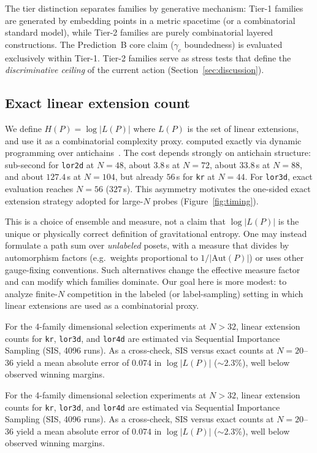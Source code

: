 \documentclass[12pt,a4paper]{article}
\begin{document}
The tier distinction separates families by generative mechanism:
Tier-1 families are generated by embedding points in a metric spacetime (or a
combinatorial standard model), while Tier-2 families are purely combinatorial
layered constructions. The Prediction~B core claim ($\gamma_c$ boundedness) is
evaluated exclusively within Tier-1. Tier-2 families serve as stress tests that
define the \emph{discriminative ceiling} of the current action
(Section~\ref{sec:discussion}).

\subsection{Exact linear extension count}
\label{sec:exact}

We define $H(P) = \log |L(P)|$ where $L(P)$ is the set of linear extensions, and use it as a combinatorial complexity proxy.
computed exactly via dynamic programming over
antichains~\cite{brightwell1991}. The cost depends strongly on antichain
structure: sub-second for \texttt{lor2d} at $N = 48$, about $3.8$\,s at
$N = 72$, about $33.8$\,s at $N = 88$, and about $127.4$\,s at $N = 104$, but
already $56$\,s for \texttt{kr} at $N = 44$. For \texttt{lor3d}, exact
evaluation reaches $N = 56$ ($327$\,s). This asymmetry motivates the
one-sided exact extension strategy adopted for large-$N$ probes
(Figure~\ref{fig:timing}).


This is a choice of ensemble and measure, not a claim that $\log|L(P)|$ is the
unique or physically correct definition of gravitational entropy. One may
instead formulate a path sum over \emph{unlabeled} posets, with a measure that
divides by automorphism factors (e.g.\ weights proportional to $1/|\mathrm{Aut}(P)|$)
or uses other gauge-fixing conventions. Such alternatives change the effective
measure factor and can modify which families dominate. Our goal here is more
modest: to analyze finite-$N$ competition in the labeled (or label-sampling)
setting in which linear extensions are used as a combinatorial proxy.

For the 4-family dimensional selection experiments at $N > 32$, linear extension
counts for \texttt{kr}, \texttt{lor3d}, and \texttt{lor4d} are estimated via
Sequential Importance Sampling (SIS, 4096 runs). As a cross-check, SIS versus
exact counts at $N = 20$--$36$ yield a mean absolute error of $0.074$ in
$\log|L(P)|$ ($\sim 2.3\%$), well below observed winning margins.

For the 4-family dimensional selection experiments at $N > 32$, linear extension
counts for \texttt{kr}, \texttt{lor3d}, and \texttt{lor4d} are estimated via
Sequential Importance Sampling (SIS, 4096 runs). As a cross-check, SIS versus
exact counts at $N = 20$--$36$ yield a mean absolute error of $0.074$ in
$\log|L(P)|$ ($\sim 2.3\%$), well below observed winning margins.
\end{document}

